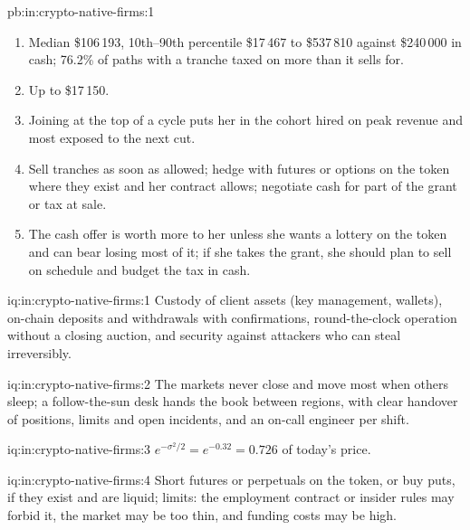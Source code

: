 \begin{solution}{pb:in:crypto-native-firms:1}
\begin{enumerate}
\item Median \$106\,193, 10th--90th percentile \$17\,467 to \$537\,810 against \$240\,000 in cash; 76.2\% of paths with a
tranche taxed on more than it sells for.
\item Up to \$17\,150.
\item Joining at the top of a cycle puts her in the cohort hired on peak revenue and most exposed to the next cut.
\item Sell tranches as soon as allowed; hedge with futures or options on the token where they exist and her contract
allows; negotiate cash for part of the grant or tax at sale.
\item The cash offer is worth more to her unless she wants a lottery on the token and can bear losing most of it; if she
takes the grant, she should plan to sell on schedule and budget the tax in cash.
\end{enumerate}
\end{solution}

\begin{solution}{iq:in:crypto-native-firms:1}
Custody of client assets (key management, wallets), on-chain deposits and withdrawals with confirmations, round-the-clock
operation without a closing auction, and security against attackers who can steal irreversibly.
\end{solution}

\begin{solution}{iq:in:crypto-native-firms:2}
The markets never close and move most when others sleep; a follow-the-sun desk hands the book between regions, with clear
handover of positions, limits and open incidents, and an on-call engineer per shift.
\end{solution}

\begin{solution}{iq:in:crypto-native-firms:3}
$e^{-\sigma^2/2}=e^{-0.32}=0.726$ of today's price.
\end{solution}

\begin{solution}{iq:in:crypto-native-firms:4}
Short futures or perpetuals on the token, or buy puts, if they exist and are liquid; limits: the employment contract or
insider rules may forbid it, the market may be too thin, and funding costs may be high.
\end{solution}


